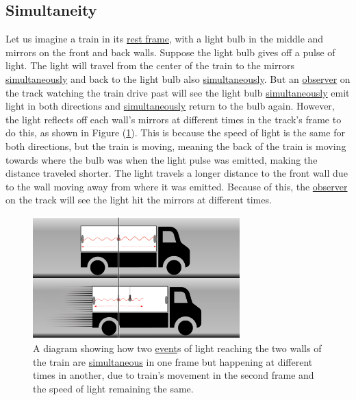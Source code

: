 \subsection{Simultaneity}

Let us imagine a train in its \hyperlink{def-proper-frame}{rest frame}, with a light bulb in the middle and mirrors on the front and back walls.
Suppose the light bulb gives off a pulse of light.
The light will travel from the center of the train to the mirrors \hyperlink{def-simultaneity}{simultaneously} and back to the light bulb also \hyperlink{def-simultaneity}{simultaneously}.
But an \hyperlink{def-observer}{observer} on the track watching the train drive past will see the light bulb \hyperlink{def-simultaneity}{simultaneously} emit light in both directions and \hyperlink{def-simultaneity}{simultaneously} return to the bulb again.
However, the light reflects off each wall's mirrors at different times in the track's frame to do this, as shown in Figure (\ref{fig: train simultaneity}).
This is because the speed of light is the same for both directions, but the train is moving, meaning the back of the train is moving towards where the bulb was when the light pulse was emitted, making the distance traveled shorter.
The light travels a longer distance to the front wall due to the wall moving away from where it was emitted.
Because of this, the \hyperlink{def-observer}{observer} on the track will see the light hit the mirrors at different times.

\begin{figure}[htbp]
	\centering
	\includegraphics[width=8cm]{images/pdf/lorry_simul.pdf}
	\caption{A diagram showing how two \protect\hyperlink{def-event}{event}s of light reaching the two walls of the train are \protect\hyperlink{def-simultaneity}{simultaneous} in one frame but happening at different times in another, due to train's movement in the second frame and the speed of light remaining the same.}
	\label{fig: train simultaneity}
\end{figure}

